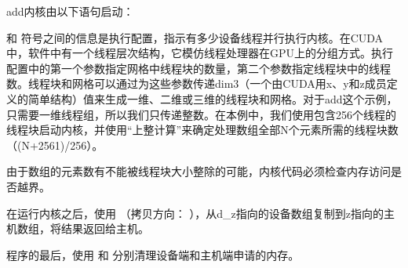 \documentclass[a4paper,12pt,english]{sphinxmanual}
\begin{document}
\sphinxAtStartPar
add内核由以下语句启动：

\begin{sphinxVerbatim}[commandchars=\\\{\}]
\end{sphinxVerbatim}

\sphinxAtStartPar
\sphinxstylestrong{<<<} 和 \sphinxstylestrong{>>>} 符号之间的信息是执行配置，指示有多少设备线程并行执行内核。在CUDA中，软件中有一个线程层次结构，它模仿线程处理器在GPU上的分组方式。执行配置中的第一个参数指定网格中线程块的数量，第二个参数指定线程块中的线程数。线程块和网格可以通过为这些参数传递dim3（一个由CUDA用x、y和z成员定义的简单结构）值来生成一维、二维或三维的线程块和网格。对于add这个示例，只需要一维线程组，所以我们只传递整数。在本例中，我们使用包含256个线程的线程块启动内核，并使用“上整计算”来确定处理数组全部N个元素所需的线程块数（(N+256\sphinxhyphen{}1)/256）。

\sphinxAtStartPar
由于数组的元素数有不能被线程块大小整除的可能，内核代码必须检查内存访问是否越界。

\sphinxAtStartPar
在运行内核之后，使用  （拷贝方向：  ），从d\_z指向的设备数组复制到z指向的主机数组，将结果返回给主机。

\begin{sphinxVerbatim}[commandchars=\\\{\}]
\end{sphinxVerbatim}

\sphinxAtStartPar
程序的最后，使用  和  分别清理设备端和主机端申请的内存。

\begin{sphinxVerbatim}[commandchars=\\\{\}]
\end{sphinxVerbatim}
\end{document}
